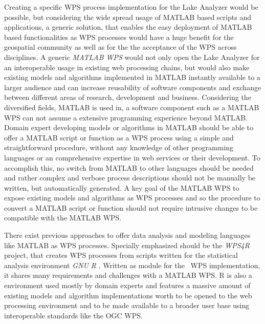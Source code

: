 	Creating a specific \ac{WPS} process implementation for the Lake Analyzer would be possible, but considering the wide spread usage of MATLAB based scripts and applications, a generic solution, that enables the easy deployment of MATLAB based functionalities as \acl{WPS} processes would have a huge benefit for the geospatial community as well as for the the acceptance of the \ac{WPS} across disciplines. A generic \emph{MATLAB WPS} would not only open the Lake Analyzer for an interoperable usage in existing web processing chains, but would also make existing models and algorithms implemented in MATLAB instantly available to a larger audience and can increase reusability of software components and exchange between different areas of research, development and business.
	Considering the diversified fields, MATLAB is used in, a software component such as a MATLAB WPS can not assume a extensive programming experience beyond MATLAB. Domain expert developing models or algorithms in MATLAB should be able to offer a MATLAB script or function as a \ac{WPS} process using a simple and straightforward procedure, without any knowledge of other programming languages or an comprehensive expertise in web services or their development. To accomplish this, no switch from MATLAB to other languages should be needed and rather complex and verbose process descriptions should not be manually be written, but automatically generated. A key goal of the MATLAB WPS to expose existing models and algorithms as \ac{WPS} processes and so the procedure to convert a MATLAB script or function should not require intrusive changes to be compatible with the MATLAB WPS.

	There exist previous approaches to offer data analysis and modeling languages like MATLAB as \ac{WPS} processes. Specially emphasized should be the \emph{WPS4R} \citep{wps4r} project, that creates WPS processes from scripts written for the statistical analysis environment \emph{GNU R} \citep{gnur}. Written as module for the \ftn~\ac{WPS} implementation, it shares many requirements and challenges with a MATLAB WPS. R is also a environment used mostly by domain experts and features a massive amount of existing models and algorithm implementations worth to be opened to the web processing environment and to be made available to a broader user base using interoperable standards like the \ac{OGC} \acl{WPS}.

	

